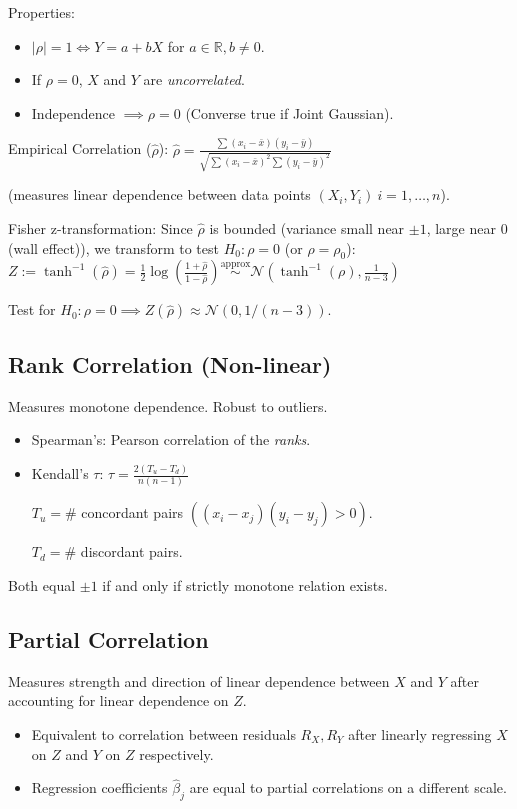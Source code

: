Properties:
\begin{itemize}
    \item $|\rho|=1 \iff Y = a + bX$ for $a \in \mathbb{R}, b \neq 0$.
    \item If $\rho=0$, $X$ and $Y$ are \textit{uncorrelated}.
    \item Independence $\implies \rho=0$ (Converse true if Joint Gaussian).
\end{itemize}
Empirical Correlation ($\hat{\rho}$):
$\hat{\rho} = \frac{\sum (x_i - \bar{x})(y_i - \bar{y})}{\sqrt{\sum (x_i-\bar{x})^2 \sum (y_i-\bar{y})^2}}$

(measures linear dependence between data points $(X_i, Y_i) \ i=1,\dots,n$).

Fisher z-transformation:
Since $\hat{\rho}$ is bounded (variance small near $\pm 1$, large near $0$ (wall effect)), we transform to test $H_0: \rho = 0$ (or $\rho=\rho_0$):
$Z := \tanh^{-1}(\widehat{\rho}) = \frac{1}{2} \log \left( \frac{1 + \widehat{\rho}}{1 - \widehat{\rho}} \right) \overset{\text{approx}}{\sim} \mathcal{N}\left(\tanh^{-1}(\rho), \frac{1}{n-3}\right)$

Test for $H_0: \rho=0 \implies Z(\hat{\rho}) \approx \mathcal{N}(0, 1/(n-3))$.

\subsection*{Rank Correlation (Non-linear)}
Measures monotone dependence. Robust to outliers.
\begin{itemize}
    \item Spearman's: Pearson correlation of the \textit{ranks}.
    \item Kendall's $\tau$:
    $\tau = \frac{2(T_u - T_d)}{n(n-1)}$
    
    $T_u = \#$ concordant pairs $((x_i-x_j)(y_i-y_j)>0)$.
    
    $T_d = \#$ discordant pairs.
\end{itemize}

Both equal $\pm 1$ if and only if strictly monotone relation exists.

\subsection*{Partial Correlation}
Measures strength and direction of linear dependence between $X$ and $Y$ after accounting for linear dependence on $Z$.
\begin{itemize}
    \item Equivalent to correlation between residuals $R_X, R_Y$ after linearly regressing $X$ on $Z$ and $Y$ on $Z$ respectively.
    \item Regression coefficients $\hat{\beta}_j$ are equal to partial correlations on a different scale.
\end{itemize}

